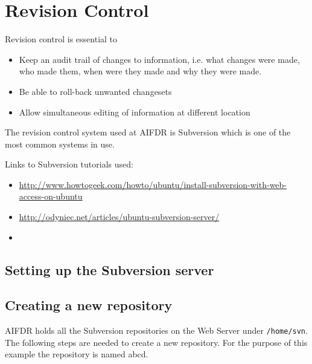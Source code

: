 \chapter{Revision Control}

Revision control is essential to 
\begin{itemize} 
  \item Keep an audit trail of changes to information, i.e. what changes were made, who made them, when were they made and why they were made.
  \item Be able to roll-back unwanted changesets
  \item Allow simultaneous editing of information at different location
\end{itemize}

The revision control system used at AIFDR is Subversion \cite{} which is one of the most common systems in use.

Links to Subversion tutorials used:
\begin{itemize} 
  \item \url{http://www.howtogeek.com/howto/ubuntu/install-subversion-with-web-access-on-ubuntu}
  \item \url{http://odyniec.net/articles/ubuntu-subversion-server/}
  \item \url{}
\end{itemize} 

\section{Setting up the Subversion server}  

\section{Creating a new repository}

AIFDR holds all the Subversion repositories on the Web Server
under \texttt{/home/svn}.
The following steps are needed to create a new repository.
For the purpose of this example the repository is named abcd.

